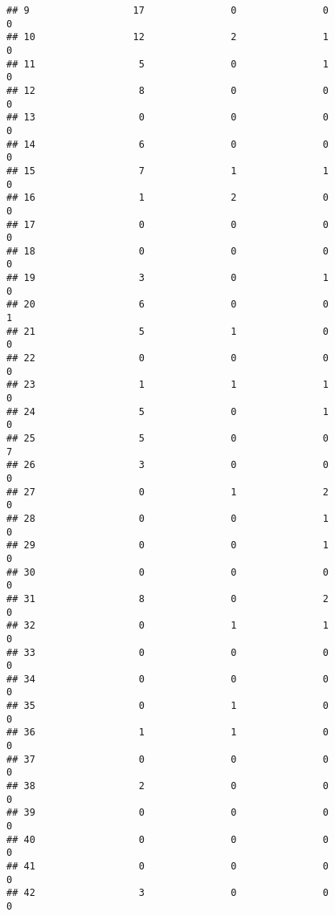 \documentclass[
]{article}
\begin{document}
\begin{verbatim}
## 9                  17               0               0                   0
## 10                 12               2               1                   0
## 11                  5               0               1                   0
## 12                  8               0               0                   0
## 13                  0               0               0                   0
## 14                  6               0               0                   0
## 15                  7               1               1                   0
## 16                  1               2               0                   0
## 17                  0               0               0                   0
## 18                  0               0               0                   0
## 19                  3               0               1                   0
## 20                  6               0               0                   1
## 21                  5               1               0                   0
## 22                  0               0               0                   0
## 23                  1               1               1                   0
## 24                  5               0               1                   0
## 25                  5               0               0                   7
## 26                  3               0               0                   0
## 27                  0               1               2                   0
## 28                  0               0               1                   0
## 29                  0               0               1                   0
## 30                  0               0               0                   0
## 31                  8               0               2                   0
## 32                  0               1               1                   0
## 33                  0               0               0                   0
## 34                  0               0               0                   0
## 35                  0               1               0                   0
## 36                  1               1               0                   0
## 37                  0               0               0                   0
## 38                  2               0               0                   0
## 39                  0               0               0                   0
## 40                  0               0               0                   0
## 41                  0               0               0                   0
## 42                  3               0               0                   0

\end{verbatim}
\end{document}
